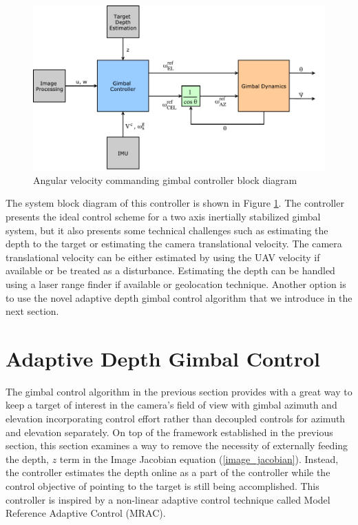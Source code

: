 \begin{figure}[htbp]
	\centering
	\includegraphics[width = 5in]{images/chapter2/gp_blockdiagram.pdf}
	\caption{Angular velocity commanding gimbal controller block diagram}
	\label{avcg_blockdiagram}
\end{figure}
The system block diagram of this controller is shown in Figure \ref{avcg_blockdiagram}. The controller presents the ideal control scheme for a two axis inertially stabilized gimbal system, but it also presents some technical challenges such as estimating the depth to the target or estimating the camera translational velocity. The camera translational velocity can be either estimated by using the UAV velocity if available or be treated as a disturbance. Estimating the depth can be handled using a laser range finder if available or geolocation technique. Another option is to use the novel adaptive depth gimbal control algorithm that we introduce in the next section.

\section{Adaptive Depth Gimbal Control}
The gimbal control algorithm in the previous section provides with a great way to keep a target of interest in the camera's field of view with gimbal azimuth and elevation incorporating control effort rather than decoupled controls for azimuth and elevation separately. On top of the framework established in the previous section, this section examines a way to remove the necessity of externally feeding the depth, $z$ term in the Image Jacobian equation (\ref{image_jacobian}). Instead, the controller estimates the depth online as a part of the controller while the control objective of pointing to the target is still being accomplished. This controller is inspired by a non-linear adaptive control technique called Model Reference Adaptive Control (MRAC).
